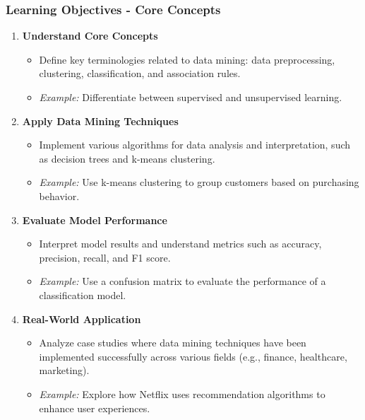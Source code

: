 \documentclass[aspectratio=169]{beamer}
\begin{document}
\begin{frame}[fragile]
    \frametitle{Learning Objectives - Core Concepts}
    \begin{enumerate}
        \item \textbf{Understand Core Concepts} 
        \begin{itemize}
            \item Define key terminologies related to data mining: data preprocessing, clustering, classification, and association rules.
            \item \textit{Example:} Differentiate between supervised and unsupervised learning.
        \end{itemize}

        \item \textbf{Apply Data Mining Techniques} 
        \begin{itemize}
            \item Implement various algorithms for data analysis and interpretation, such as decision trees and k-means clustering.
            \item \textit{Example:} Use k-means clustering to group customers based on purchasing behavior.
        \end{itemize}

        \item \textbf{Evaluate Model Performance} 
        \begin{itemize}
            \item Interpret model results and understand metrics such as accuracy, precision, recall, and F1 score.
            \item \textit{Example:} Use a confusion matrix to evaluate the performance of a classification model.
        \end{itemize}

        \item \textbf{Real-World Application} 
        \begin{itemize}
            \item Analyze case studies where data mining techniques have been implemented successfully across various fields (e.g., finance, healthcare, marketing).
            \item \textit{Example:} Explore how Netflix uses recommendation algorithms to enhance user experiences.
        \end{itemize}
    \end{enumerate}
\end{frame}
\end{document}
